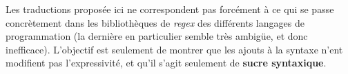 Les traductions proposée ici ne correspondent pas forcément à ce qui se passe concrètement dans les bibliothèques de \textit{regex} des différents langages de programmation (la dernière en particulier semble très ambigüe, et donc inefficace). L'objectif est seulement de montrer que les ajouts à la syntaxe n'ent modifient pas l'expressivité, et qu'il s'agit seulement de \textbf{sucre syntaxique}.
